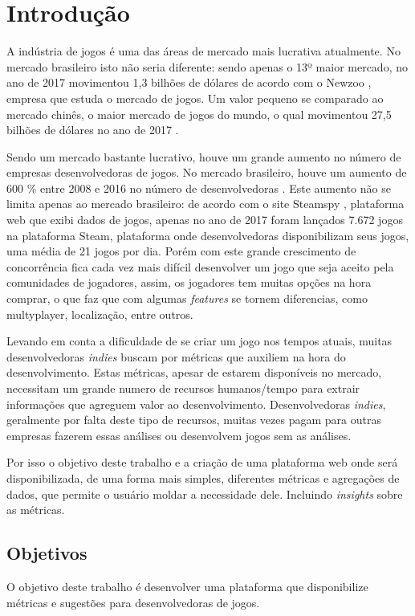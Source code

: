 \chapter[Introdução]{Introdução}
A indústria de jogos é uma das áreas de mercado mais lucrativa atualmente. No mercado brasileiro isto não seria diferente: sendo apenas o 13º maior mercado, no ano de 2017 movimentou 1,3 bilhões de dólares de acordo com o Newzoo \cite{newzoo_brasil}, empresa que estuda o mercado de jogos. Um valor pequeno se comparado ao mercado chinês, o maior mercado de jogos do mundo, o qual movimentou 27,5 bilhões de dólares no ano de 2017 \cite{newzoo_china}.

Sendo um mercado bastante lucrativo, houve um grande aumento no número de empresas desenvolvedoras de jogos. No mercado brasileiro, houve um aumento de 600 \% entre 2008 e 2016 no número de desenvolvedoras \cite{desenvolvedoras_crescimento}. Este aumento não se limita apenas ao mercado brasileiro: de acordo com o site Steamspy \cite{steam_spy}, plataforma web que exibi dados de jogos, apenas no ano de 2017 foram lançados 7.672 jogos na plataforma Steam, plataforma onde desenvolvedoras disponibilizam seus jogos, uma média de 21 jogos por dia. Porém com este grande crescimento de concorrência fica cada vez mais difícil desenvolver um jogo que seja aceito pela comunidades de jogadores, assim, os jogadores tem muitas opções na hora comprar, o que faz que com algumas \textit{features} se tornem diferencias, como multyplayer, localização, entre outros.

Levando em conta a dificuldade de se criar um jogo nos tempos atuais, muitas desenvolvedoras \textit{indies} buscam por métricas que auxiliem na hora do desenvolvimento. Estas métricas, apesar de estarem disponíveis no mercado, necessitam um grande numero de recursos humanos/tempo para extrair informações que agreguem valor ao desenvolvimento. Desenvolvedoras \textit{indies}, geralmente por falta deste tipo de recursos, muitas vezes pagam para outras empresas fazerem essas análises ou desenvolvem jogos sem as análises. 

Por isso o objetivo deste trabalho e a criação de uma plataforma web onde será disponibilizada, de uma forma mais simples, diferentes métricas e agregações de dados, que permite o usuário moldar a necessidade dele. Incluindo \textit{insights} sobre as métricas.

\section{Objetivos}
	O objetivo deste trabalho é desenvolver uma plataforma que disponibilize métricas e sugestões para desenvolvedoras de jogos.
	
